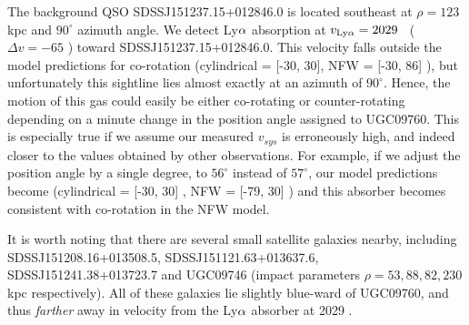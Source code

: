 The background QSO SDSSJ151237.15+012846.0 is located southeast at $\rho = 123$ kpc and $90^{\circ}$ azimuth angle. We detect Ly$\rm \alpha$ absorption at $v_{\rm Ly\alpha} = 2029$ \kms~($\Delta v = -65$ \kms) toward SDSSJ151237.15+012846.0. This velocity falls outside the model predictions for co-rotation (cylindrical = [-30, 30], NFW = [-30, 86] \kms), but unfortunately this sightline lies almost exactly at an azimuth of $90^{\circ}$. Hence, the motion of this gas could easily be either co-rotating or counter-rotating depending on a minute change in the position angle assigned to UGC09760. This is especially true if we assume our measured $v_{sys}$ is erroneously high, and indeed closer to the values obtained by other observations. For example, if we adjust the position angle by a single degree, to $56^{\circ}$ instead of $57^{\circ}$, our model predictions become (cylindrical = [-30, 30] , NFW = [-79, 30] \kms) and this absorber becomes consistent with co-rotation in the NFW model.


It is worth noting that there are several small satellite galaxies nearby, including SDSSJ151208.16+013508.5, SDSSJ151121.63+013637.6, SDSSJ151241.38+013723.7 and UGC09746 (impact parameters $\rho = 53, 88, 82, 230$ kpc respectively). All of these galaxies lie slightly blue-ward of UGC09760, and thus \emph{farther} away in velocity from the Ly$\rm \alpha$ absorber at 2029 \kms.

